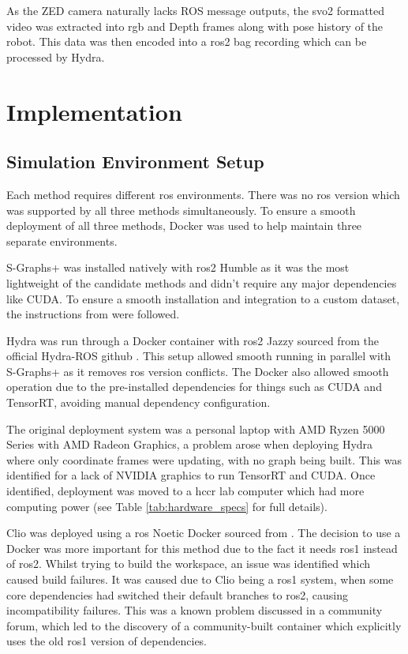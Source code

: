 As the ZED camera naturally lacks ROS message outputs, the svo2 formatted video was extracted into \acrshort{rgb} and Depth frames along with pose history of the robot. This data was then encoded into a \acrshort{ros}2 bag recording which can be processed by Hydra.


\section{Implementation}\label{sec:implementation}

\subsection{Simulation Environment Setup}\label{sec:sim-env-setup}

Each method requires different \acrshort{ros} environments. There was no \acrshort{ros} version which was supported by all three methods simultaneously. To ensure a smooth deployment of all three methods, Docker was used to help maintain three separate environments.

S-Graphs+ was installed natively with \acrshort{ros}2 Humble as it was the most lightweight of the candidate methods and didn’t require any major dependencies like CUDA. To ensure a smooth installation and integration to a custom dataset, the instructions from \cite{sgraphs-install} were followed.

Hydra was run through a Docker container with \acrshort{ros}2 Jazzy sourced from the official Hydra-ROS github \cite{hydra-ros-docker}. This setup allowed smooth running in parallel with S-Graphs+ as it removes \acrshort{ros} version conflicts. The Docker also allowed smooth operation due to the pre-installed dependencies for things such as CUDA and TensorRT, avoiding manual dependency configuration.

The original deployment system was a personal laptop with AMD Ryzen 5000 Series with AMD Radeon Graphics, a problem arose when deploying Hydra where only coordinate frames were updating, with no graph being built. This was identified for a lack of NVIDIA graphics to run TensorRT and CUDA. Once identified, deployment was moved to a \gls{hccr} lab computer which had more computing power (see Table \ref{tab:hardware_specs} for full details).

Clio was deployed using a \acrshort{ros} Noetic Docker sourced from \cite{cliodocker}. The decision to use a Docker was more important for this method due to the fact it needs \acrshort{ros}1 instead of \acrshort{ros}2. Whilst trying to build the workspace, an issue was identified which caused build failures. It was caused due to Clio being a \acrshort{ros}1 system, when some core dependencies had switched their default branches to \acrshort{ros}2, causing incompatibility failures. This was a known problem discussed in a community forum, which led to the discovery of a community-built container which explicitly uses the old \acrshort{ros}1 version of dependencies.

